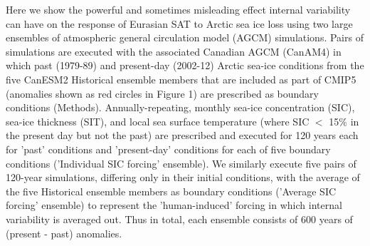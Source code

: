 \documentclass[grl]{AGUTeX}  %
\begin{document}
\begin{article}
Here we show the powerful and sometimes misleading effect internal variability can have on the response of Eurasian SAT to Arctic sea ice loss using two large ensembles of atmospheric general circulation model (AGCM) simulations. Pairs of simulations are executed with the associated Canadian AGCM (CanAM4) in which past (1979-89) and present-day (2002-12) Arctic sea-ice conditions from the five CanESM2 Historical ensemble members that are included as part of CMIP5 (anomalies shown as red circles in Figure 1) are prescribed as boundary conditions (Methods). Annually-repeating, monthly sea-ice concentration (SIC), sea-ice thickness (SIT), and local sea surface temperature (where SIC $<$ 15\% in the present day but not the past) are prescribed and executed for 120 years each for 'past' conditions and 'present-day' conditions for each of five boundary conditions ('Individual SIC forcing' ensemble). We similarly execute five pairs of 120-year simulations, differing only in their initial conditions, with the average of the five Historical ensemble members as boundary conditions ('Average SIC forcing' ensemble) to represent the 'human-induced' forcing in which internal variability is averaged out. Thus in total, each ensemble consists of 600 years of (present - past) anomalies.


\end{article}
\end{document}
